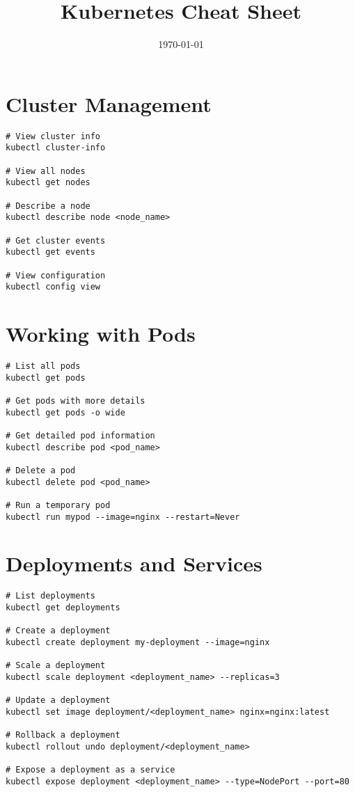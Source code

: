\documentclass[11pt]{article}
\title{\textbf{Kubernetes Cheat Sheet}}
\author{}
\date{\today}
\begin{document}
    \maketitle

    \section*{Cluster Management}
    \begin{lstlisting}[style=kubeStyle]
# View cluster info
kubectl cluster-info

# View all nodes
kubectl get nodes

# Describe a node
kubectl describe node <node_name>

# Get cluster events
kubectl get events

# View configuration
kubectl config view
    \end{lstlisting}

    \section*{Working with Pods}
    \begin{lstlisting}[style=kubeStyle]
# List all pods
kubectl get pods

# Get pods with more details
kubectl get pods -o wide

# Get detailed pod information
kubectl describe pod <pod_name>

# Delete a pod
kubectl delete pod <pod_name>

# Run a temporary pod
kubectl run mypod --image=nginx --restart=Never
    \end{lstlisting}

    \section*{Deployments and Services}
    \begin{lstlisting}[style=kubeStyle]
# List deployments
kubectl get deployments

# Create a deployment
kubectl create deployment my-deployment --image=nginx

# Scale a deployment
kubectl scale deployment <deployment_name> --replicas=3

# Update a deployment
kubectl set image deployment/<deployment_name> nginx=nginx:latest

# Rollback a deployment
kubectl rollout undo deployment/<deployment_name>

# Expose a deployment as a service
kubectl expose deployment <deployment_name> --type=NodePort --port=80
    \end{lstlisting}
\end{document}
